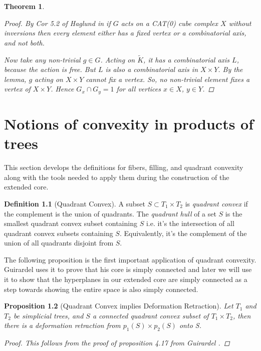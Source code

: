 \documentclass[12pt,parskip=full]{report}
\theoremstyle{plain}
\newtheorem{thm}{Theorem}[section]
\newtheorem{prop}[thm]{Proposition}
\theoremstyle{definition}
\newtheorem{dfn}[thm]{Definition}
\begin{document}
\begin{thm}
\begin{proof}
By Cor 5.2 of Haglund in \cite{haglundss} if \(G\) acts on a CAT(0) cube complex \(X\)
without inversions then every element either has a fixed vertex or a
combinatorial axis, and not both.

Now take any non-trivial \(g \in G\). Acting on \(\widetilde K\), it has a combinatorial
axis \(L\), because the action is free. But \(L\) is also a combinatorial axis
in \(X\times Y\). By the lemma, \(g\) acting on \(X\times Y\) cannot fix a vertex.
So, no non-trivial element fixes a vertex of \(X\times Y\). Hence \(G_x \cap G_y =
1\) for all vertices \(x \in X\), \(y \in Y\).
    
\end{proof}
\end{thm}


\chapter{Notions of convexity in products of trees}




This section develops the definitions for fibers, filling, and quadrant convexity along with the tools needed to apply them during the construction of the extended core.  

\begin{dfn}
    [Quadrant Convex]
    A subset \(S \subset T_1\times T_2\) is \emph{quadrant convex} if the complement is the union of quadrants. The \emph{quadrant hull} of a set \(S\) is the smallest quadrant convex subset containing \(S\) i.e. it's the intersection of all quadrant convex subsets containing \(S\). Equivalently, it's the complement of the union of all quadrants disjoint from \(S\). 
\end{dfn}


The following proposition is the first important application of quadrant convexity. Guirardel uses it to prove that his core is simply connected and later we will use it to show that the hyperplanes in our extended core are simply connected as a step towards showing the entire space is also simply connected.

\begin{prop}
    [Quadrant Convex implies Deformation Retraction]
    Let \(T_1\) and \(T_2\) be simplicial trees, and \(S\) a connected quadrant convex subset of \(T_1\times T_2\), then there is a deformation retraction from \(p_1(S) \times p_2(S)\) onto S. 
    
    \begin{proof}
        This follows from the proof of proposition 4.17 from Guirardel \cite{guirardelcorepaper}.
    \end{proof}
\end{prop}
\end{document}
